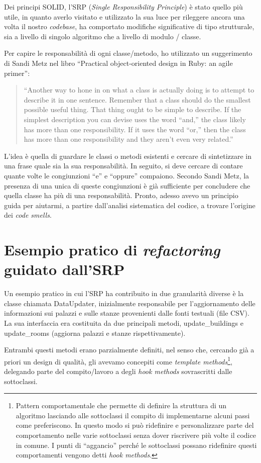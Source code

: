 \documentclass[12pt]{report}
\begin{document}
Dei principi SOLID, l'SRP (\textit{Single Responsibility Principle})
è stato quello più utile, in quanto averlo visitato e utilizzato la sua luce
per rileggere ancora una volta il nostro \textit{codebase}, ha comportato 
modifiche significative di tipo strutturale, sia a livello di singolo 
algoritmo che a livello di modulo / classe.

Per capire le responsabilità di ogni classe/metodo, ho utilizzato un
suggerimento di Sandi Metz nel libro ``Practical object-oriented 
design in Ruby: an agile primer'':

\begin{quote}
``Another way to hone in on what a class is actually doing is to attempt 
to describe it in one sentence. Remember that a class should do 
the smallest possible useful thing. That thing ought to be simple 
to describe. If the simplest description you can devise uses the word ``and,'' 
the class likely has more than one responsibility. If it uses the word ``or,'' 
then the class has more than one responsibility and they aren’t 
even very related.''\cite{metz2013}
\end{quote}

L'idea è quella di guardare
le classi o metodi esistenti e cercare di sintetizzare in una frase quale sia
la sua responsabilità. In seguito, si deve cercare di contare quante volte le
congiunzioni ``e'' e ``oppure'' compaiono. Secondo Sandi Metz, la presenza di
una unica di queste congiunzioni è già sufficiente per concludere che
quella classe ha più di una responsabilità. Pronto, adesso avevo un
principio guida per aiutarmi, a partire dall'analisi sistematica del codice,
a trovare l'origine dei \textit{code smells}.

\section{Esempio pratico di \textit{refactoring} guidato dall'SRP}

Un esempio pratico in cui l'SRP ha contribuito in due granularità diverse è la
classe chiamata DataUpdater, inizialmente responsabile per l'aggiornamento 
delle informazioni sui palazzi e sulle stanze provenienti dalle fonti testuali 
(file CSV). La sua interfaccia era costituita da due principali 
metodi, update\_buildings e update\_rooms (aggiorna palazzi e stanze 
rispettivamente).

Entrambi questi metodi erano parzialmente definiti, nel senso che, cercando già
a priori un design di qualità, gli avevamo concepiti come
\textit{template methods}\footnote{
Pattern comportamentale che permette di 
definire la struttura di un algoritmo lasciando alle sottoclassi il compito di 
implementarne alcuni passi come preferiscono. In questo modo si può ridefinire 
e personalizzare parte del comportamento nelle varie sottoclassi senza dover 
riscrivere più volte il codice in comune. I punti di ``aggancio'' perché le 
sottoclassi possano ridefinire questi comportamenti vengono detti 
\textit{hook methods}.
},
delegando parte del compito/lavoro a degli \textit{hook methods} sovrascritti
dalle sottoclassi.
\end{document}
